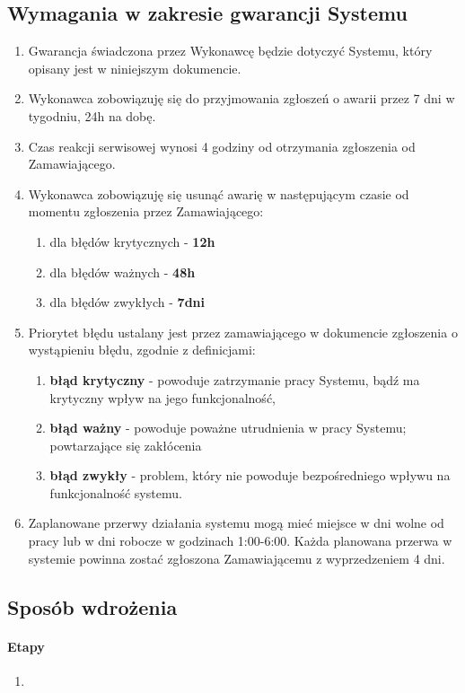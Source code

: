 \documentclass{article}
\begin{document}
\subsection{Wymagania w zakresie gwarancji Systemu}
\begin{enumerate}
	\item Gwarancja świadczona przez Wykonawcę będzie dotyczyć Systemu, który opisany jest w niniejszym dokumencie.
	\item Wykonawca zobowiązuję się do przyjmowania zgłoszeń o awarii przez 7 dni w tygodniu, 24h na dobę.
	\item Czas reakcji serwisowej wynosi 4 godziny od otrzymania zgłoszenia od Zamawiającego.
	\item Wykonawca zobowiązuję się usunąć awarię w następującym czasie od momentu zgłoszenia przez Zamawiającego:
	\begin{enumerate}
		\item dla błędów krytycznych - \textbf{12h}
		\item dla błędów ważnych - \textbf{48h}
		\item dla błędów zwykłych - \textbf{7dni}
	\end{enumerate}

	\item Priorytet błędu ustalany jest przez zamawiającego w dokumencie zgłoszenia o wystąpieniu błędu, zgodnie z definicjami:
	\begin{enumerate}
		\item \textbf{błąd krytyczny} - powoduje zatrzymanie pracy Systemu, bądź ma krytyczny wpływ na jego funkcjonalność,
		\item \textbf{błąd ważny} - powoduje poważne utrudnienia w pracy Systemu; powtarzające się zakłócenia
		\item \textbf{błąd zwykły} - problem, który nie powoduje bezpośredniego wpływu na funkcjonalność systemu.
	\end{enumerate}

	\item Zaplanowane przerwy działania systemu mogą mieć miejsce w dni wolne od pracy lub w dni robocze w godzinach 1:00-6:00. Każda planowana przerwa w systemie powinna zostać zgłoszona Zamawiającemu z wyprzedzeniem 4 dni.

\end{enumerate}
\subsection{Sposób wdrożenia}
\paragraph{Etapy}
\begin{enumerate}
\item
\end{enumerate}
\end{document}
